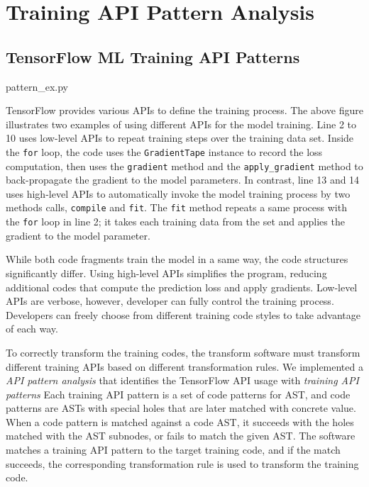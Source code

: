 \section{Training API Pattern Analysis}\label{sec:pattern}

\subsection{TensorFlow ML Training API Patterns}


{pattern_ex.py}

TensorFlow provides various APIs to define the training process.
The above figure illustrates two examples of using 
different APIs for the model training.
Line 2 to 10 uses low-level APIs to repeat training steps over the training
data set. Inside the {\tt for} loop, 
the code uses the {\tt GradientTape} instance to record the loss computation,
then uses the {\tt gradient} method and the {\tt apply\_gradient} method to
back-propagate the gradient to the model parameters.
In contrast, line 13 and 14 uses high-level APIs to automatically
invoke the model training process by two methods calls, {\tt compile} and
{\tt fit}. The {\tt fit} method repeats a same process with the {\tt for}
loop in line 2; it takes each training data from the set and
applies the gradient to the model parameter.

While both code fragments train the model in a same way, 
the code structures significantly differ.
Using high-level APIs simplifies the program,
reducing additional codes that compute the prediction loss and apply gradients.
Low-level APIs are verbose, however, developer can fully control
the training process.
Developers can freely choose from different training code styles to
take advantage of each way.

To correctly transform the training codes,
the transform software must transform different training APIs
based on different transformation rules. 
We implemented a \textit{API pattern analysis} that identifies
the TensorFlow API usage with \textit{training API patterns} 
Each training API pattern is a set of code patterns for AST,
and code patterns are ASTs with
special holes that are later matched with concrete value.
When a code pattern is matched against a code AST,
it succeeds with the holes matched with the AST subnodes,
or fails to match the given AST.
The software matches a training API pattern to the target training code,
and if the match succeeds, the corresponding transformation rule
is used to transform the training code.

